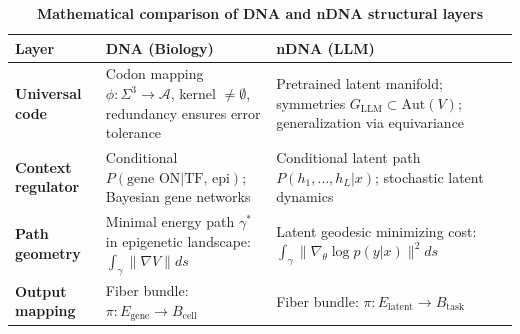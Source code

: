 \begin{table}[H]
\centering
\caption*{\centering \textbf{Mathematical comparison of DNA and nDNA structural layers}}
\begin{tabular}{p{3cm} | p{5.6cm} | p{5.6cm}}
\toprule
\textbf{Layer} & \textbf{DNA (Biology)} & \textbf{nDNA (LLM)} \\
\midrule
\textbf{Universal code} & Codon mapping $\phi: \Sigma^3 \to \mathcal{A}$, kernel $\neq \emptyset$, redundancy ensures error tolerance \citep{lewin2013genes} & Pretrained latent manifold; symmetries $G_{\mathrm{LLM}} \subset \mathrm{Aut}(V)$; generalization via equivariance \citep{bommasani2021opportunities} \\
\textbf{Context regulator} & Conditional $P(\text{gene ON}|\text{TF, epi})$; Bayesian gene networks \citep{alon2006introduction} & Conditional latent path $P(h_1,\dots,h_L|x)$; stochastic latent dynamics \citep{geva2021transformer} \\
\textbf{Path geometry} & Minimal energy path $\gamma^*$ in epigenetic landscape: $\int_\gamma \|\nabla V\| ds$ \citep{waddington1957strategy} & Latent geodesic minimizing cost: $\int_\gamma \|\nabla_\theta \log p(y|x)\|^2 ds$ \citep{still2012thermodynamic} \\
\textbf{Output mapping} & Fiber bundle: $\pi: E_{\mathrm{gene}} \to B_{\mathrm{cell}}$ & Fiber bundle: $\pi: E_{\mathrm{latent}} \to B_{\mathrm{task}}$ \\
\bottomrule
\end{tabular}
\end{table}





